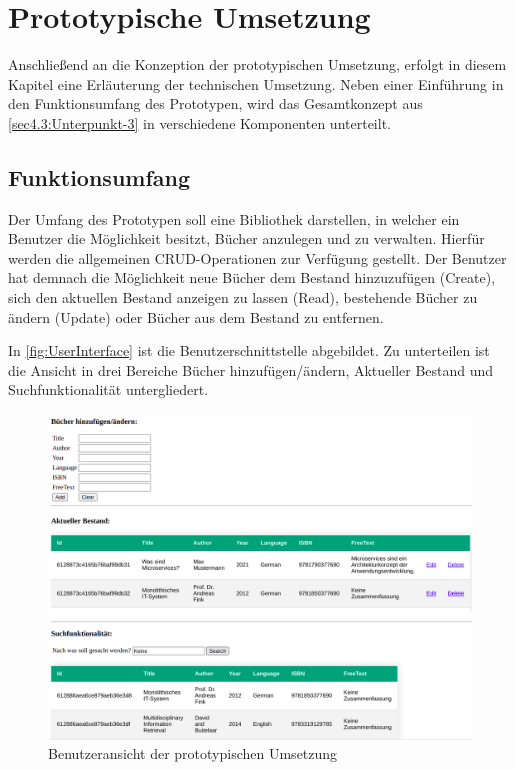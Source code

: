 \chapter{Prototypische Umsetzung\label{chap5:Fuenftes-Kapitel}}

Anschließend an die Konzeption der prototypischen Umsetzung, erfolgt in diesem Kapitel eine Erläuterung der technischen Umsetzung. Neben einer Einführung in den Funktionsumfang des Prototypen, wird das Gesamtkonzept aus \autoref{sec4.3:Unterpunkt-3} in verschiedene Komponenten unterteilt.


\section{Funktionsumfang\label{sec5.1:Unterpunkt-1}}

Der Umfang des Prototypen soll eine Bibliothek darstellen, in welcher ein Benutzer die Möglichkeit besitzt, Bücher anzulegen und zu verwalten. Hierfür werden die allgemeinen CRUD-Operationen zur Verfügung gestellt. Der Benutzer hat demnach die Möglichkeit neue Bücher dem Bestand hinzuzufügen (Create), sich den aktuellen Bestand anzeigen zu lassen (Read), bestehende Bücher zu ändern (Update) oder Bücher aus dem Bestand zu entfernen.

In \autoref{fig:UserInterface} ist die Benutzerschnittstelle abgebildet. Zu unterteilen ist die Ansicht in drei Bereiche \glqq Bücher hinzufügen/ändern\grqq{}, \glqq Aktueller Bestand\grqq{} und \glqq Suchfunktionalität\grqq{} untergliedert.

\begin{figure}[H]
    \centering
    \includegraphics[width=0.9\linewidth]{images/UserInterface.png}
    \caption{Benutzeransicht der prototypischen Umsetzung}
    \label{fig:UserInterface}
\end{figure}

